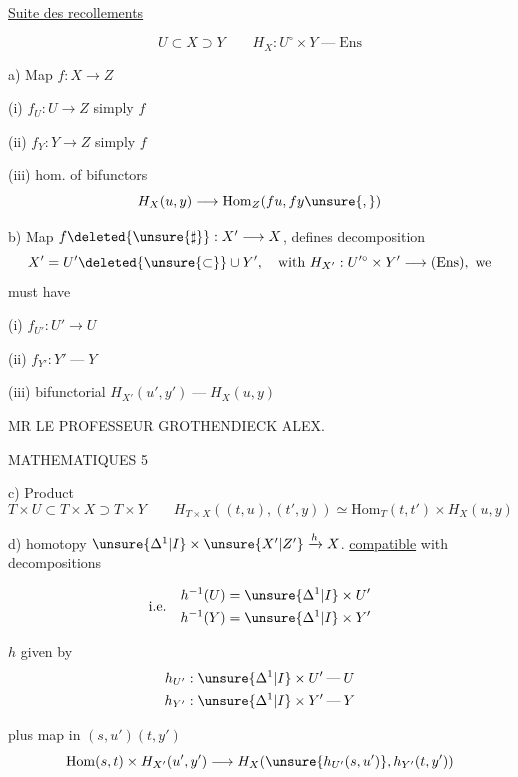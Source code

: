 \uline{Suite des recollements}

\[
U\subset X\supset Y\qquad H_X:U^\circ\times Y\mathbin{\text{---}}\mathrm{Ens}
\]

a) Map  $f:X\longrightarrow Z$

(i) $f_U:U\longrightarrow Z$ simply $f$

(ii) $f_Y:Y\longrightarrow Z$ simply $f$

(iii) hom. of bifunctors
\[
H_X(u,y)\longrightarrow\mathrm{Hom}_Z(fu,fy\unsure{,})
\]

b) Map $f\deleted{\unsure{\sharp}}:X'\longrightarrow X$, defines decomposition
\[
X'=U'\deleted{\unsure{\subset}}\cup Y',\quad\text{with }H_{X'}:U'^\circ\times Y'\longrightarrow(\mathrm{Ens}),\text{ we}
\]
must have

(i) $f_{U'}:U'\longrightarrow U$

(ii) $f_{Y'}:Y'\mathbin{\text{---}}Y$

(iii) bifunctorial $H_{X'}(u',y')\mathbin{\text{---}}H_X(u,y)$

\begin{center}
MR LE PROFESSEUR GROTHENDIECK ALEX.

MATHEMATIQUES \hfill 5
\end{center}

c) Product
\[
T\times U\subset T\times X\supset T\times Y\qquad
H_{T\times X}((t,u),(t',y))\simeq\mathrm{Hom}_T(t,t')\times H_X(u,y)
\]

\hrulefill

d) homotopy $\unsure{\Delta^1|I}\times\unsure{X'|Z'}\xrightarrow{h}X$. \uline{compatible} with decompositions

\[
\text{i.e.}\quad\begin{aligned}
h^{-1}(U)&=\unsure{\Delta^1|I}\times U'\\
h^{-1}(Y)&=\unsure{\Delta^1|I}\times Y'
\end{aligned}
\]

$h$ given by
\[
\begin{aligned}
h_{U'}&:\unsure{\Delta^1|I}\times U'\mathbin{\text{---}}U\\
h_{Y'}&:\unsure{\Delta^1|I}\times Y'\mathbin{\text{---}}Y
\end{aligned}
\]

plus  map in $(s,u')(t,y')$
\[
\mathrm{Hom}(s,t)\times H_{X'}(u',y')\longrightarrow
H_X(\unsure{h_{U'}(s,u')},h_{Y'}(t,y'))
\]
